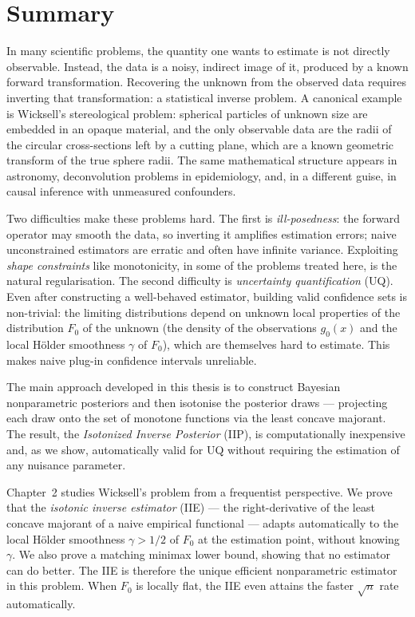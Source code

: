 \chapter{Summary}

In many scientific problems, the quantity one wants to estimate is not directly observable. Instead, the data is a noisy, indirect image of it, produced by a known forward transformation. Recovering the unknown from the observed data requires inverting that transformation: a statistical inverse problem. A canonical example is Wicksell's stereological problem: spherical particles of unknown size are embedded in an opaque material, and the only observable data are the radii of the circular cross-sections left by a cutting plane, which are a known geometric transform of the true sphere radii. The same mathematical structure appears in astronomy, deconvolution problems in epidemiology, and, in a different guise, in causal inference with unmeasured confounders.

Two difficulties make these problems hard. The first is \textit{ill-posedness}: the forward operator may smooth the data, so inverting it amplifies estimation errors; naive unconstrained estimators are erratic and often have infinite variance. Exploiting \textit{shape constraints} like monotonicity, in some of the problems treated here, is the natural regularisation. The second difficulty is \textit{uncertainty quantification} (UQ). Even after constructing a well-behaved estimator, building valid confidence sets is non-trivial: the limiting distributions depend on unknown local properties of the distribution $F_0$ of the unknown (the density of the observations $g_0(x)$ and the local H\"{o}lder smoothness $\gamma$ of $F_0$), which are themselves hard to estimate. This makes naive plug-in confidence intervals unreliable.

The main approach developed in this thesis is to construct Bayesian nonparametric posteriors and then isotonise the posterior draws --- projecting each draw onto the set of monotone functions via the least concave majorant. The result, the \textit{Isotonized Inverse Posterior} (IIP), is computationally inexpensive and, as we show, automatically valid for UQ without requiring the estimation of any nuisance parameter.

Chapter~2 studies Wicksell's problem from a frequentist perspective. We prove that the \textit{isotonic inverse estimator} (IIE) --- the right-derivative of the least concave majorant of a naive empirical functional --- adapts automatically to the local H\"{o}lder smoothness $\gamma > 1/2$ of $F_0$ at the estimation point, without knowing $\gamma$. We also prove a matching minimax lower bound, showing that no estimator can do better. The IIE is therefore the unique efficient nonparametric estimator in this problem. When $F_0$ is locally flat, the IIE even attains the faster $\sqrt{n}$ rate automatically.

